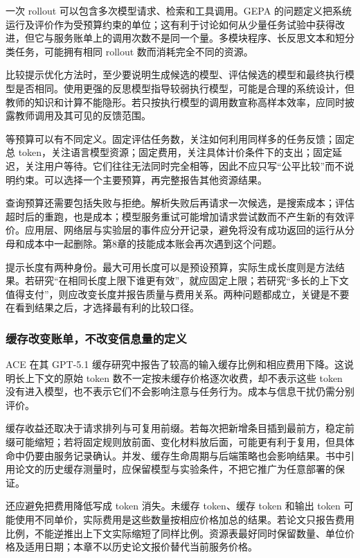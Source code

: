 一次 rollout 可以包含多次模型请求、检索和工具调用。GEPA 的问题定义把系统运行及评价作为受预算约束的单位\cite{gepa-2507}；这有利于讨论如何从少量任务试验中获得改进，但它与服务账单上的调用次数不是同一个量。多模块程序、长反思文本和短分类任务，可能拥有相同 rollout 数而消耗完全不同的资源。

比较提示优化方法时，至少要说明生成候选的模型、评估候选的模型和最终执行模型是否相同。使用更强的反思模型指导较弱执行模型，可能是合理的系统设计，但教师的知识和计算不能隐形。若只按执行模型的调用数宣称高样本效率，应同时披露教师调用及其可见的反馈范围。

等预算可以有不同定义。固定评估任务数，关注如何利用同样多的任务反馈；固定总 token，关注语言模型资源；固定费用，关注具体计价条件下的支出；固定延迟，关注用户等待。它们往往无法同时完全相等，因此不应只写“公平比较”而不说明约束。可以选择一个主要预算，再完整报告其他资源结果。

查询预算还需要包括失败与拒绝。解析失败后再请求一次候选，是搜索成本；评估超时后的重跑，也是成本；模型服务重试可能增加请求尝试数而不产生新的有效评价。应用层、网络层与实验层的事件应分开记录，避免将没有成功返回的运行从分母和成本中一起删除。第8章的技能成本账会再次遇到这个问题。

提示长度有两种身份。最大可用长度可以是预设预算，实际生成长度则是方法结果。若研究“在相同长度上限下谁更有效”，就应固定上限；若研究“多长的上下文值得支付”，则应改变长度并报告质量与费用关系。两种问题都成立，关键是不要在看到结果之后，才选择最有利的比较口径。

\subsubsection{缓存改变账单，不改变信息量的定义}

ACE 在其 GPT-5.1 缓存研究中报告了较高的输入缓存比例和相应费用下降\cite{ace-2510}。这说明长上下文的原始 token 数不一定按未缓存价格逐次收费，却不表示这些 token 没有进入模型，也不表示它们不会影响注意与任务行为。成本与信息干扰仍需分别评价。

缓存收益还取决于请求排列与可复用前缀。若每次把新增条目插到最前方，稳定前缀可能缩短；若将固定规则放前面、变化材料放后面，可能更有利于复用，但具体命中仍要由服务记录确认。并发、缓存生命周期与后端策略也会影响结果。书中引用论文的历史缓存测量时，应保留模型与实验条件，不把它推广为任意部署的保证。

还应避免把费用降低写成 token 消失。未缓存 token、缓存 token 和输出 token 可能使用不同单价，实际费用是这些数量按相应价格加总的结果。若论文只报告费用比例，不能逆推出上下文实际缩短了同样比例。资源表最好同时保留数量、单位价格及适用日期；本章不以历史论文报价替代当前服务价格。

